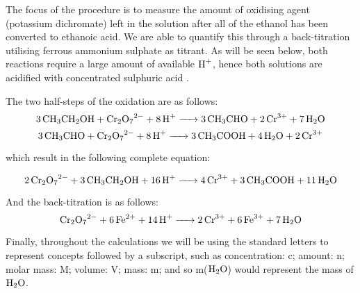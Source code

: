 The focus of the procedure is to measure the amount of oxidising agent (potassium dichromate) left in the solution after all of the ethanol has been converted to ethanoic acid. We are able to quantify this through a back-titration utilising ferrous ammonium sulphate as titrant. As will be seen below, both reactions require a large amount of available $\ce{H+}$, hence both solutions are acidified with concentrated sulphuric acid \citep{FergSirromet}.

The two half-steps of the oxidation are as follows:
\begin{equation}\label{eq:EthanolToAldehyde}
\ce{3CH3CH2OH + Cr2O7^{2-} + 8H+ -> 3CH3CHO + 2 Cr^{3+} + 7H2O}
\end{equation}
\begin{equation}\label{eq:AldehydeToAcid}
\ce{3CH3CHO + Cr2O7^{2-} + 8H+ -> 3CH3COOH + 4H2O + 2 Cr^{3+}}
\end{equation}

which result in the following complete equation:

\begin{equation} \label{eq:EthanolToAcid}
\ce{2Cr2O7^{2-} + 3 CH3CH2OH + 16 H+ -> 4 Cr^{3+} + 3 CH3COOH + 11 H2O}
\end{equation}

And the back-titration is as follows:
\begin{equation} \label{eq:Titration}
\ce{ Cr2O7^{2-} + 6 Fe^{2+} + 14H+ -> 2Cr^{3+} + 6Fe^{3+} + 7 H2O }
\end{equation}

Finally, throughout the calculations we will be using the standard letters to represent concepts followed by a subscript, such as concentration: c; amount: n; molar mass: M; volume: V; mass: m; and so m($\ce{H2O}$) would represent the mass of $\ce{H2O}$.